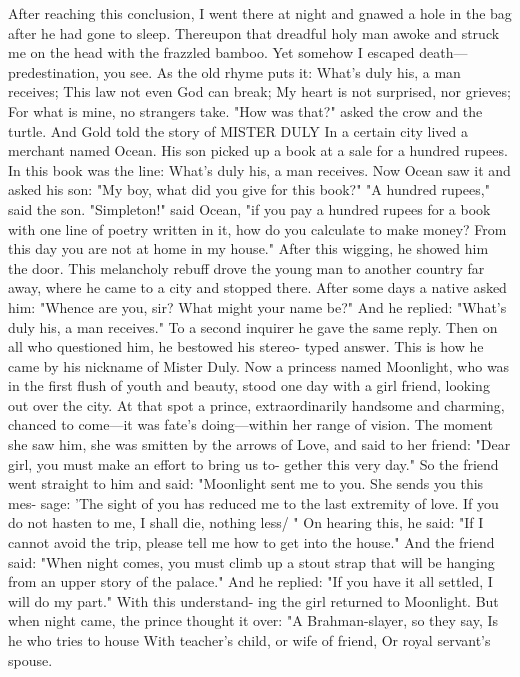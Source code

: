 \documentclass{book}
\begin{document}
After reaching this conclusion, I went there at
night and gnawed a hole in the bag after he had gone
to sleep. Thereupon that dreadful holy man awoke
and struck me on the head with the frazzled bamboo.
Yet somehow I escaped death---predestination, you
see. As the old rhyme puts it:
What's duly his, a man receives;
This law not even God can break;
My heart is not surprised, nor grieves;
For what is mine, no strangers take.
"How was that?" asked the crow and the turtle.
And Gold told the story of
MISTER DULY
In a certain city lived a merchant named Ocean.
His son picked up a book at a sale for a hundred
rupees. In this book was the line:
What's duly his, a man receives.
Now Ocean saw it and asked his son: "My boy,
what did you give for this book?" "A hundred
rupees," said the son. "Simpleton!" said Ocean, "if
you pay a hundred rupees for a book with one line of
poetry written in it, how do you calculate to make
money? From this day you are not at home in my
house." After this wigging, he showed him the door.
This melancholy rebuff drove the young man to
another country far away, where he came to a city
and stopped there. After some days a native asked
him: "Whence are you, sir? What might your name
be?" And he replied:
"What's duly his, a man receives."
To a second inquirer he gave the same reply. Then
on all who questioned him, he bestowed his stereo-
typed answer. This is how he came by his nickname
of Mister Duly.
Now a princess named Moonlight, who was in the
first flush of youth and beauty, stood one day with a
girl friend, looking out over the city. At that spot a
prince, extraordinarily handsome and charming,
chanced to come---it was fate's doing---within her
range of vision. The moment she saw him, she was
smitten by the arrows of Love, and said to her friend:
"Dear girl, you must make an effort to bring us to-
gether this very day."
So the friend went straight to him and said:
"Moonlight sent me to you. She sends you this mes-
sage: 'The sight of you has reduced me to the last
extremity of love. If you do not hasten to me, I shall
die, nothing less/ "
On hearing this, he said: "If I cannot avoid the
trip, please tell me how to get into the house." And
the friend said: "When night comes, you must climb
up a stout strap that will be hanging from an upper
story of the palace." And he replied: "If you have it
all settled, I will do my part." With this understand-
ing the girl returned to Moonlight.
But when night came, the prince thought it over:
"A Brahman-slayer, so they say,
Is he who tries to house
With teacher's child, or wife of friend,
Or royal servant's spouse.
\end{document}
